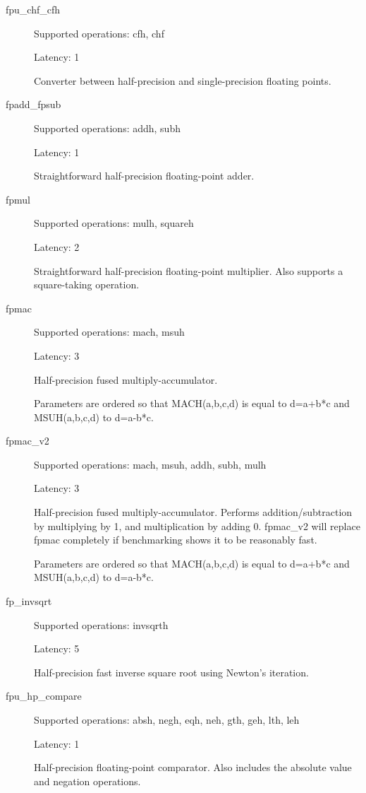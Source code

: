 \documentclass[a4paper,twoside]{tceusermanual}
\begin{document}
\begin{description}

\item[fpu\_chf\_cfh]

Supported operations: cfh, chf

Latency: 1

Converter between half-precision and single-precision floating points.

\item[fpadd\_fpsub]

Supported operations: addh, subh

Latency: 1

Straightforward half-precision floating-point adder.

\item[fpmul]

Supported operations:         mulh, squareh

Latency:             2

Straightforward half-precision floating-point multiplier. Also supports a square-taking operation.

\item[fpmac]

Supported operations:         mach, msuh

Latency:             3

Half-precision fused multiply-accumulator.

Parameters are ordered so that MACH(a,b,c,d) is equal to d=a+b*c and MSUH(a,b,c,d) to d=a-b*c.

\item[fpmac\_v2]

Supported operations:         mach, msuh, addh, subh, mulh

Latency:             3

Half-precision fused multiply-accumulator. Performs addition/subtraction by multiplying by 1,
and multiplication by adding 0. fpmac\_v2 will replace fpmac completely if benchmarking shows it
to be reasonably fast.

Parameters are ordered so that MACH(a,b,c,d) is equal to d=a+b*c and MSUH(a,b,c,d) to d=a-b*c.


\item[fp\_invsqrt]

Supported operations: invsqrth

Latency:             5

Half-precision fast inverse square root using Newton's iteration.

\item[fpu\_hp\_compare]

Supported operations:         absh, negh, eqh, neh, gth, geh, lth, leh

Latency:             1

Half-precision floating-point comparator. Also includes the absolute value and negation operations.

\end{description}
\end{document}
